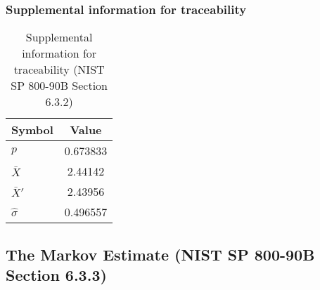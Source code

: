 \documentclass[a3paper,xelatex,english]{bxjsarticle}
\begin{document}
\subsubsection{Supplemental information for traceability}
\renewcommand{\arraystretch}{1.8}
\begin{table}[h]
\caption{Supplemental information for traceability (NIST SP 800-90B Section 6.3.2)}
\begin{center}
\begin{tabular}{|l|c|}
\hline 
\rowcolor{anotherlightblue} %
Symbol				& Value \\ \hline 
$p$				& 0.673833\\ \hline 
$\bar{X}$ 		&  2.44142\\ \hline
$\bar{X}'$		&  2.43956\\ \hline
$\hat{\sigma}$		& 0.496557\\ \hline
\end{tabular}
\end{center}
\end{table}
\renewcommand{\arraystretch}{1.4}
\clearpage
\subsection{The Markov Estimate (NIST SP 800-90B Section 6.3.3)}\label{sec:Binary633}
\end{document}
